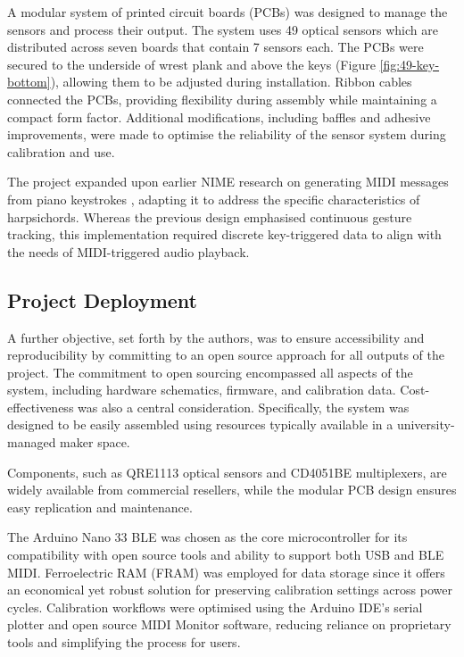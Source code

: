 A modular system of printed circuit boards (PCBs) was designed to manage the sensors and process their output. The system uses 49 optical sensors which are distributed across seven boards that contain 7 sensors each. The PCBs were secured to the underside of wrest plank and above the keys (Figure \ref{fig:49-key-bottom}), allowing them to be adjusted during installation. Ribbon cables connected the PCBs, providing flexibility during assembly while maintaining a compact form factor. Additional modifications, including baffles and adhesive improvements, were made to optimise the reliability of the sensor system during calibration and use.

The project expanded upon earlier NIME research on generating MIDI messages from piano keystrokes \cite{McPherson2013}, adapting it to address the specific characteristics of harpsichords. Whereas the previous design emphasised continuous gesture tracking, this implementation required discrete key-triggered data to align with the needs of MIDI-triggered audio playback. 

\subsection{Project Deployment}

A further objective, set forth by the authors, was to ensure accessibility and reproducibility by committing to an open source approach for all outputs of the project. The commitment to open sourcing encompassed all aspects of the system, including hardware schematics, firmware, and calibration data. Cost-effectiveness was also a central consideration. 
Specifically, the system was designed to be easily assembled using resources typically available in a university-managed maker space.


Components, such as QRE1113 optical sensors and CD4051BE multiplexers, are widely available from commercial resellers, while the modular PCB design ensures easy replication and maintenance.

The Arduino Nano 33 BLE was chosen as the core microcontroller for its compatibility with open source tools and ability to support both USB and BLE MIDI. Ferroelectric RAM (FRAM) was employed for data storage since it offers an economical yet robust solution for preserving calibration settings across power cycles. Calibration workflows were optimised using the Arduino IDE’s serial plotter and open source MIDI Monitor software, reducing reliance on proprietary tools and simplifying the process for users. 

